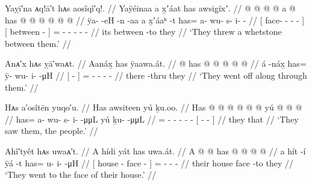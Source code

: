 \ex\label{ex:92-108-threw-whetstone-between}%
%
\begingl
	\glpreamble	Yaỵī′na ᴀq!ā′t hᴀs aosîqî′q!. //
	\glpreamble	Yaÿéinaa a x̱ʼáat has awsig̱íxʼ. //
	\gla	{}  @ {} @ {} @ {} @ {} {}
		{} a  @ {} {}
		has @  @ {} @ {} @ {} @ {} @ {} //
	\glb	{} ÿa-  -eH -n -aa {}
		{} a x̱ʼáaᵏ -t {}
		has= a- wu- s- i-  - //
	\glc	{}[ face-  - - - {}]
		{}[  between - {}]
		= - - - -  - //
	\gld	{}  {} {} {} {} {}
		{} its between -to {}
		they  {} {} {} {} {} //
	\glft	‘They threw a whetstone between them.’
		//
\endgl
\xe

\ex\label{ex:92-109-go-along-thru}%
%
\begingl
	\glpreamble	Anᴀ′x hᴀs ỵā′waᴀt. //
	\glpreamble	Aanáx̱ has ÿaawa.át. //
	\gla	{}  @ {} {}
		has @  @ {} @ {} @ {} @ {} //
	\glb	{} á -náx̱ {}
		has= ÿ- wu- i-  -μH //
	\glc	{}[  - {}]
		= - - -  - //
	\gld	{} there -thru {}
		they  {} {} {} {} //
	\glft	‘They went off along through them.’
		//
\endgl
\xe

\ex\label{ex:92-110-saw-people}%
%
\begingl
	\glpreamble	Hᴀs a′osîtēn yuqo′u. //
	\glpreamble	Has awsiteen yú ḵu.oo. //
	\gla	Has @  @ {} @ {} @ {} @ {} @ {}
		{} yú  @ {} @ {} @ {} {} //
	\glb	has= a- wu- s- i-  -μμL
		{} yú ḵu-  -μμL {} {} //
	\glc	{}= - - - -  -
		{}[  -  - \· {}] //
	\gld	they  {} {} {} {} {}
		{} that  {} {} {} {} //
	\glft	‘They saw them, the people.’
		//
\endgl
\xe

\ex\label{ex:92-111-went-to-house-face}%
%
\begingl
	\glpreamble	Ahî′tyêt hᴀs uwaᴀ′t. //
	\glpreamble	A hídi yát has uwa.át. //
	\gla	{} A  @ {}  @ {} {}
		has @  @ {} @ {} @ {} //
	\glb	{} a hít -í ÿá -t {}
		has= u- i-  -μH //
	\glc	{}[  house - face - {}]
		= - -  - //
	\gld	{} their house {} face -to {}
		they  {} {} {} //
	\glft	‘They went to the face of their house.’
		//
\endgl
\xe

